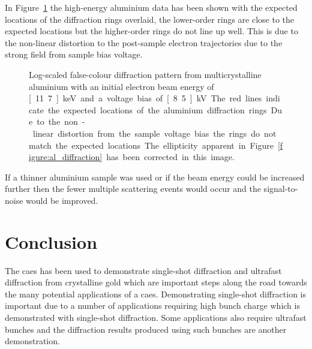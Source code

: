 In Figure~\ref{figure:al_diffraction_rings} the high-energy aluminium data has been shown with the expected locations of the diffraction rings overlaid, the lower-order rings are close to the expected locations but the higher-order rings do not line up well.
This is due to the non-linear distortion to the post-sample electron trajectories due to the strong field from sample bias voltage.

\begin{figure}
    \center
    
    \caption{Log-scaled false-colour diffraction pattern from multicrystalline aluminium with an initial electron beam energy of \unit[11.7]{keV} and a voltage bias of \unit[8.5]{kV}. The red lines indicate the expected locations of the aluminium diffraction rings. Due to the non-linear distortion from the sample voltage bias the rings do not match the expected locations. The ellipticity apparent in Figure~\ref{figure:al_diffraction} has been corrected in this image.}
    \label{figure:al_diffraction_rings}
\end{figure}

If a thinner aluminium sample was used or if the beam energy could be increased further then the fewer multiple scattering events would occur and the signal-to-noise would be improved.

\section{Conclusion}

The \gls{caes} has been used to demonstrate single-shot diffraction and ultrafast diffraction from crystalline gold which are important steps along the road towards the many potential applications of a \gls{caes}.
Demonstrating single-shot diffraction is important due to a number of applications requiring high bunch charge which is demonstrated with single-shot diffraction.
Some applications also require ultrafast bunches and the diffraction results produced using such bunches are another demonstration.